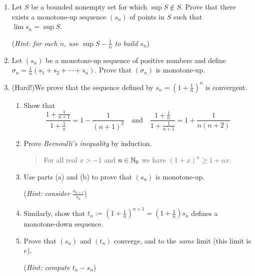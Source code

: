 \begin{exercisessec}{}{}
\begin{enumerate}
  
  \item%
  Let $S$ be a bounded nonempty set for which $\sup S\notin S$. Prove that there exists a monotone-up sequence $(s_n)$ of points in $S$ such that $\lim s_n=\sup S$.\par
  (\emph{Hint: for each $n$, use $\sup S-\frac 1n$ to build $s_n$})
  
  
  \item%
  Let $(s_n)$ be a monotone-up sequence of positive numbers and define $\sigma_n=\frac 1n(s_1+s_2+\cdots+s_n)$. Prove that $(\sigma_n)$ is monotone-up.

  
  
  \item\label{exs:edefn} (Hard!)\lstsp We prove that the sequence defined by $s_n=\left(1+\frac 1n\right)^n$ is convergent.
  \begin{enumerate}
    \item Show that
    \[\frac{1+\frac 1{n+1}}{1+\frac 1n}=1-\frac 1{(n+1)^2}\quad \text{and}\quad \frac{1+\frac 1n}{1+\frac 1{n+1}}=1+\frac 1{n(n+2)}\]
	  \item Prove \emph{Bernoulli's inequality} by induction.
	  \begin{quote}
	  	For all real $x>-1$ and $n\in\mathbb{N}_0$ we have $(1+x)^n\ge 1+nx$.
	  \end{quote}
		\item Use parts (a) and (b) to prove that $(s_n)$ is monotone-up.\par
		(\emph{Hint: consider $\frac{s_{n+1}}{s_n}$}) 
		\item Similarly, show that $t_n:=\left(1+\frac 1n\right)^{n+1} =\left(1+\frac 1n\right)s_n$ defines a monotone-down sequence.
		\item Prove that $(s_n)$ and $(t_n)$ converge, and to the \emph{same} limit (this limit is $e$).\par
		(\emph{Hint: compute $t_n-s_n$})
	\end{enumerate}
  



\end{enumerate}
\end{exercisessec}
